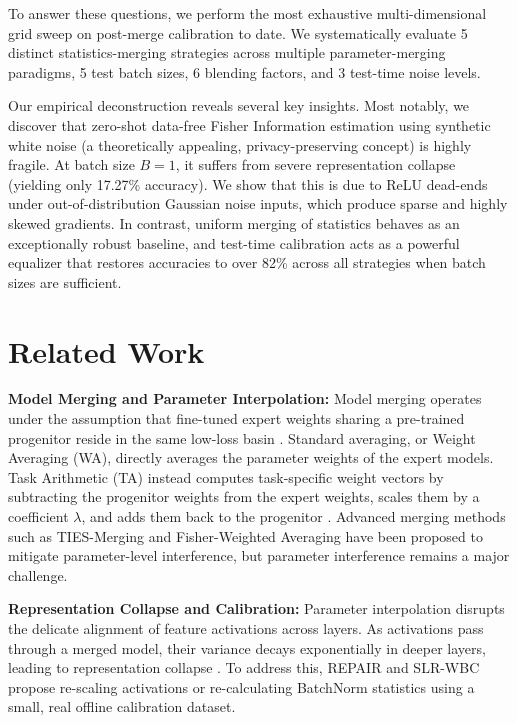 \documentclass{article}
\theoremstyle{plain}
\theoremstyle{definition}
\theoremstyle{remark}
\begin{document}
To answer these questions, we perform the most exhaustive multi-dimensional grid sweep on post-merge calibration to date. We systematically evaluate 5 distinct statistics-merging strategies across multiple parameter-merging paradigms, 5 test batch sizes, 6 blending factors, and 3 test-time noise levels. 

Our empirical deconstruction reveals several key insights. Most notably, we discover that zero-shot data-free Fisher Information estimation using synthetic white noise (a theoretically appealing, privacy-preserving concept) is highly fragile. At batch size $B=1$, it suffers from severe representation collapse (yielding only 17.27\% accuracy). We show that this is due to ReLU dead-ends under out-of-distribution Gaussian noise inputs, which produce sparse and highly skewed gradients. In contrast, uniform merging of statistics behaves as an exceptionally robust baseline, and test-time calibration acts as a powerful equalizer that restores accuracies to over 82\% across all strategies when batch sizes are sufficient.

\section{Related Work}
\label{sec:related}
\textbf{Model Merging and Parameter Interpolation:} Model merging operates under the assumption that fine-tuned expert weights sharing a pre-trained progenitor reside in the same low-loss basin \cite{wortsman22modelsoups}. Standard averaging, or Weight Averaging (WA), directly averages the parameter weights of the expert models. Task Arithmetic (TA) instead computes task-specific weight vectors by subtracting the progenitor weights from the expert weights, scales them by a coefficient $\lambda$, and adds them back to the progenitor \cite{ilharco22editing}. Advanced merging methods such as TIES-Merging \cite{yadav23ties} and Fisher-Weighted Averaging \cite{matena22fisher} have been proposed to mitigate parameter-level interference, but parameter interference remains a major challenge.

\textbf{Representation Collapse and Calibration:} Parameter interpolation disrupts the delicate alignment of feature activations across layers. As activations pass through a merged model, their variance decays exponentially in deeper layers, leading to representation collapse \cite{jordan23repair}. To address this, REPAIR \cite{jordan23repair} and SLR-WBC \cite{s6_study} propose re-scaling activations or re-calculating BatchNorm statistics using a small, real offline calibration dataset.
\end{document}
